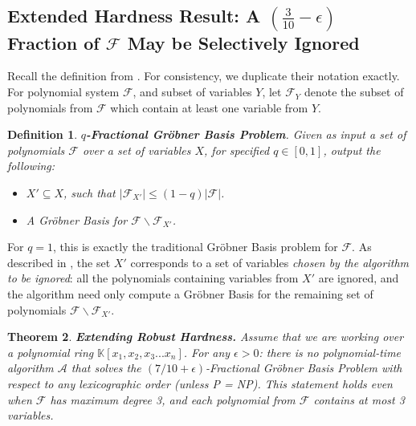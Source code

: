 \documentclass{article}
\newtheorem{theorem}{Theorem}[]
\newtheorem{definition}[theorem]{Definition}
\begin{document}


\subsection{Extended Hardness Result: A $(\frac{3}{10}-\epsilon)$ Fraction of $\mathcal{F}$ May be Selectively Ignored} \label{not2sec}

Recall the definition from \citep{RS}. For consistency, we duplicate their notation exactly. For polynomial system $\mathcal{F}$, and subset of variables $Y$, let $\mathcal{F}_Y$ denote the subset of polynomials from $\mathcal{F}$ which contain at least one variable from $Y$.

\begin{definition}
\textbf{$q$-Fractional Gr\"{o}bner Basis Problem}. Given as input a set of polynomials $\mathcal{F}$ over a set of variables $X$, for specified $q\in [0,1]$, output the following:
\begin{itemize}
\item $X'\subseteq X$, such that $|\mathcal{F}_{X'}|\leq (1-q)|\mathcal{F}|$.
\item A Gr\"{o}bner Basis for $\mathcal{F}\backslash \mathcal{F}_{X'}$.
\end{itemize}
\end{definition}

\noindent For $q=1$, this is exactly the traditional Gr\"{o}bner Basis problem for $\mathcal{F}$. As described in \citep {RS}, the set $X'$ corresponds to a set of variables \textit{chosen by the algorithm to be ignored}: all the polynomials containing variables from $X'$ are ignored, and the algorithm need only compute a Gr\"{o}bner Basis for the remaining set of polynomials $\mathcal{F}\backslash \mathcal{F}_{X'}$.

\begin{theorem} \textbf{Extending Robust Hardness.} \label{extfrachard}
Assume that we are working over a polynomial ring $\mathbb{K}[x_1,x_2,x_3...x_n]$. For any $\epsilon>0$: there is no polynomial-time algorithm $\mathcal{A}$ that solves the $(7/10+\epsilon)$-Fractional Gr\"{o}bner Basis Problem with respect to any lexicographic order (unless P = NP). This statement holds even when $\mathcal{F}$ has maximum degree 3, and each polynomial from $\mathcal{F}$ contains at most 3 variables.
\end{theorem}
\end{document}
